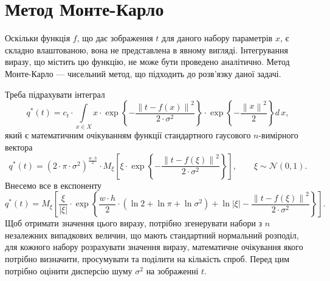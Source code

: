 \section{Метод Монте-Карло}

Оскільки функція $f$, що дає зображення $t$ для даного набору параметрів $x$,
є складно влаштованою, вона не представлена в явному вигляді.
Інтегрування виразу, що містить цю функцію, не може бути проведено аналітично.
Метод Монте-Карло --- чисельний метод, що підходить до розв'язку даної задачі.

Треба підрахувати інтеграл
\begin{equation*}
  q^* \left( t \right)
  = c_t
    \cdot \int\limits_{x \in X}
      x
      \cdot \exp{\left\{ - \frac{\left\| t - f\left( x \right) \right\|^2}
                                {2 \cdot \sigma^2} \right\}}
      \cdot \exp{\left\{ - \frac{\left\| x \right\|^2}{2} \right\}}
    d\,x,
\end{equation*}
який є математичним очікуванням функції
стандартного гаусового $n$-вимірного вектора
\begin{equation*}
  q^* \left( t \right)
  = \left( 2 \cdot \pi \cdot \sigma^2 \right)^{\frac{w \cdot h}{2}}
    \cdot M_{\xi}\left[
      \xi
      \cdot \exp{\left\{ - \frac{\left\| t - f\left( \xi \right) \right\|^2}
        {2 \cdot \sigma^2} \right\}} \right], \qquad
    \xi \sim \mathcal{N}\left( 0, 1 \right).
\end{equation*}
Внесемо все в експоненту
\begin{equation*}
  q^* \left( t \right)
  = M_{\xi}\left[
    \frac{\xi}{\left| \xi \right|}
    \cdot \exp{\left\{
        \frac{w \cdot h}{2}
          \cdot \left( \ln{2} + \ln{\pi} + \ln{\sigma^2} \right)
        + \ln{\left| \xi \right|}
        - \frac{\left\| t - f\left( \xi \right) \right\|^2}
        {2 \cdot \sigma^2} \right\}
    } \right].
\end{equation*}
Щоб отримати значення цього виразу,
потрібно згенерувати набори з $n$ незалежних випадкових величин,
що мають стандартний нормальний розподіл,
для кожного набору розрахувати значення виразу,
математичне очікування якого потрібно визначити,
просумувати та поділити на кількість спроб.
Перед цим потрібно оцінити дисперсію шуму $\sigma^2$ на зображенні $t$.


